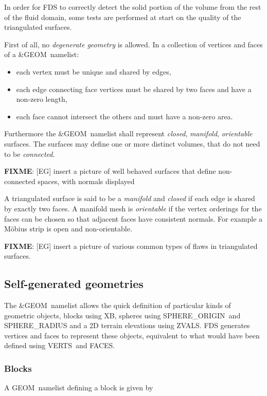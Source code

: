 \documentclass[12pt]{article}
\begin{document}
In order for FDS to correctly detect the solid portion of the volume from the rest of the fluid domain,
some tests are performed at start on the quality of the triangulated surfaces.

First of all, no \textit{degenerate geometry} is allowed.
In a collection of vertices and faces of a {\ct \&GEOM}\ namelist:

\begin{itemize}
\item each vertex must be unique and shared by edges,
\item each edge connecting face vertices must be shared by two faces and have a non-zero length,
\item each face cannot intersect the others and must have a non-zero area.
\end{itemize}

Furthermore the {\ct \&GEOM}\ namelist shall represent \textit{closed}, \textit{manifold}, \textit{orientable} surfaces.
The surfaces may define one or more distinct volumes, that do not need to be \textit{connected}.

\textbf{FIXME}: [EG] insert a picture of well behaved surfaces that define non-connected spaces, with normals displayed

A triangulated surface is said to be a \textit{manifold} and \textit{closed} if each edge is shared by exactly two faces.
A manifold mesh is \textit{orientable} if the vertex orderings for the faces can be chosen so that adjacent faces
have consistent normals. For example a Möbius strip is open and non-orientable.

\textbf{FIXME}: [EG] insert a picture of various common types of flaws in triangulated surfaces.

\subsection{Self-generated geometries}

The {\ct \&GEOM}\ namelist allows the quick definition of particular kinds of geometric objects, blocks using {\ct XB}, spheres using {\ct SPHERE\_ORIGIN}\ and {\ct SPHERE\_RADIUS}
and a 2D terrain elevations using {\ct ZVALS}. FDS generates vertices and faces to represent these objects, equivalent to what would have been defined using {\ct VERTS}\ and {\ct FACES}.

\subsubsection{Blocks}
A {\ct GEOM}\ namelist defining a block is given by
\end{document}
